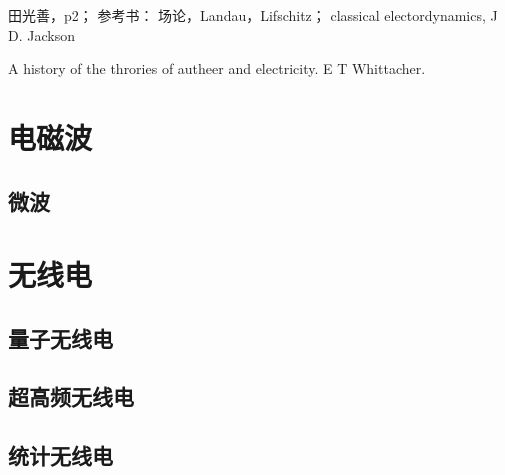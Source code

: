 \documentclass[UTF8]{../06-Physics}
\begin{document}
田光善，p2；
参考书：
场论，Landau，Lifschitz；
classical electordynamics, J D. Jackson

A history of the throries of autheer and electricity. E T Whittacher.



\chapter{电磁波}
  \section{微波}
  
\chapter{无线电}
  \section{量子无线电}
  \section{超高频无线电}
  \section{统计无线电}
\end{document}
